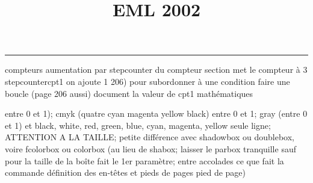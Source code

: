 \documentclass[11pt]{article}%
\title{\bf \vspace{-2cm} EML 2002} %
\author{} %
\date{} %
\renewcommand{\headrulewidth}{0pt}%
\renewcommand{\footrulewidth}{0.4pt}%
\begin{document}
\maketitle %
\vspace{-1.4cm}\hrule %
\thispagestyle{fancy}

\vspace*{.2cm}



compteurs%
aumentation par stepcounter du compteur section%
met le compteur à 3%
stepcounter{cpt1} on ajoute 1%
206) pour subordonner à une condition %
faire une boucle (page 206 aussi) %
document la valeur de cpt1 
mathématiques\newcommand{\ch}{\operatorname{ch}} 
\newcommand{\sh}{\operatorname{sh}}
\renewcommand{\tanh}{\operatorname{th}}
\renewcommand{\sinh}{\operatorname{sh}}
\renewcommand{\cosh}{\operatorname{ch}}
\newcommand{\argsh}{\operatorname{argsh}}
\newcommand{\argch}{\operatorname{argch}}
\newcommand{\argth}{\operatorname{argth}}
\newcommand{\ker}{\operatorname{Ker}}
\renewcommand{\im}{\operatorname{Im}}
\newcommand{\rg}{\operatorname{rg}}
\newcommand{\Id}{\operatorname{Id}}
\newcommand{\id}{\operatorname{id}}
\renewcommand{\leq}{\leq}
\renewcommand{\geq}{\geq }

entre 0 et 1); cmyk (quatre cyan magenta yellow black) entre 0 et 1;
gray (entre 0 et 1) et black, white, red, green, blue, cyan, magenta,
yellow%
seule ligne; ATTENTION A LA TAILLE; petite différence avec shadowbox ou
doublebox, voire fcolorbox ou colorbox (au lieu de shabox; laisser le
parbox tranquille sauf pour la taille de la boîte
\newcommand{\Tbox}[1]{\begin{center} \shabox{\parbox{0.6
\linewidth}{#1}} \end{center}} %
fait le 1er paramètre; entre accolades ce que fait la commande
définition des en-têtes et pieds de pages\pagestyle{fancy}
\chead{}
\rfoot[ \ \thepage]{\thepage}
\cfoot{}
\lfoot{}
\thispagestyle{fancy} %
pied de page)\renewcommand{\footrulewidth}{0.4pt}
\renewcommand{\headrulewidth}{0.4pt}
\end{document}
